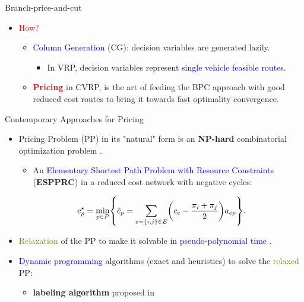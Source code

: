 \begin{frame}{Branch-price-and-cut}
	\begin{itemize}[<+->]
		\item \textcolor{red}{How?}
		      \begin{itemize}
			      \item \textcolor{blue}{Column Generation} (CG): decision variables are generated lazily.
			            \begin{itemize}
				            \item In VRP, decision variables represent \textcolor{blue}{single vehicle feasible routes}.
			            \end{itemize}
			      \item \textcolor{red}{\textbf{Pricing}} in CVRP, is the art of feeding the BPC approach with good reduced cost routes to bring it towards fast optimality convergence.
		      \end{itemize}
	\end{itemize}
\end{frame}

\begin{frame}{Contemporary Approaches for Pricing}
	\begin{itemize}[<+->]
		\item Pricing Problem (PP) in its "natural" form is an \textbf{NP-hard} combinatorial optimization problem \parencite{dror1994}.
		      \begin{itemize}[<.->]
			      \item An \textcolor{blue}{Elementary Shortest Path Problem with Resource Constraints} (\textbf{ESPPRC}) in a reduced cost network with negative cycles:
		      \end{itemize}
		      \begin{equation}\label{eq:pp-problem}
			      {c^\star_p} = \min_{p \in P} \Set*{ \bar{c}_p = \sum_{e = \Set*{i, j} \in E} \Expr*{c_{e} - \frac{\pi_i + \pi_j}{2}} a_{ep}  }.
		      \end{equation}
		\item \textcolor{olive}{Relaxation} of the PP to make it solvable in \textcolor{blue}{pseudo-polynomial time} \parencite{desrochers1988, irnich2005}.
		\item \textcolor{blue}{Dynamic programming} algorithms (exact and heuristics) to solve the \textcolor{olive}{relaxed} PP:
		      \begin{itemize}[<.->]
			      \item \textbf{labeling algorithm} proposed in \textcite{desrochers1992,feillet2004}
		      \end{itemize}

	\end{itemize}
\end{frame}

